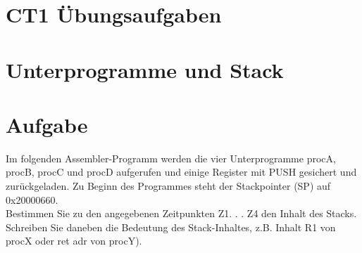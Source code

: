 \documentclass[10pt]{article}
\begin{document}
\section*{CT1 Übungsaufgaben}
\section*{Unterprogramme und Stack}
\section*{Aufgabe}
Im folgenden Assembler-Programm werden die vier Unterprogramme procA, procB, procC und procD aufgerufen und einige Register mit PUSH gesichert und zurückgeladen. Zu Beginn des Programmes steht der Stackpointer (SP) auf 0x20000660.\\
Bestimmen Sie zu den angegebenen Zeitpunkten Z1. . . Z4 den Inhalt des Stacks. Schreiben Sie daneben die Bedeutung des Stack-Inhaltes, z.B. Inhalt R1 von procX oder ret adr von procY).
\end{document}
